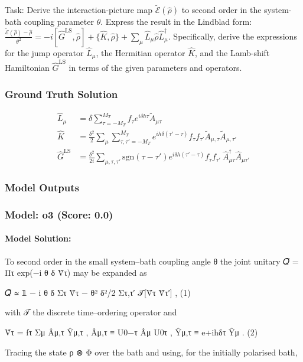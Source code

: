\documentclass[10pt]{article}
\begin{document}
Task:
Derive the interaction-picture map $\tilde{\mathcal{E}}(\hat \rho)$ to second order in the system-bath coupling parameter $\theta$. Express the result in the Lindblad form:
$\frac{\tilde{\mathcal{E}}(\hat\rho)-\hat{\rho}}{\theta^2} = -i[\hat G^{\text{LS}}, \hat\rho]+ \{\hat K,\hat\rho\}+\sum_\mu \hat L_\mu \hat\rho\hat L_\mu^\dagger$.
Specifically, derive the expressions for the jump operator $\hat L_\mu$, the Hermitian operator $\hat K$, and the Lamb-shift Hamiltonian $\hat G^{\text{LS}}$ in terms of the given parameters and operators.

\subsubsection*{Ground Truth Solution}
\[ \boxed{\begin{aligned}
\hat L_\mu &= \delta \sum_{\tau=-M_T}^{M_T} f_\tau e^{i\delta h\tau}\tilde A_{\mu\tau} \\
\hat K &= \frac{\delta^2}{2}\sum_{\mu}\sum_{\tau,\tau'=-M_T}^{M_T}e^{ih\delta(\tau'-\tau)}f_\tau f_{\tau'} \tilde{A}_{\mu,\tau}\tilde{A}_{\mu,\tau'} \\
\hat G^{\text{LS}} &= \frac{\delta^2}{2i}\sum_{\mu,\tau,\tau'}\text{sgn}(\tau-\tau')e^{i\delta h(\tau'-\tau)}f_\tau f_{\tau'}\ \hat A^\dagger_{\mu\tau}\hat A_{\mu\tau'}
\end{aligned}} \]

\subsubsection*{Model Outputs}
\subsubsection*{Model: o3 (Score: 0.0)}
\paragraph*{Model Solution:}
To second order in the small system–bath coupling angle θ the joint unitary  
                           𝑄̃ = Πτ exp(−i θ δ  Ṽτ)  
may be expanded as  

      𝑄̃ ≃ 𝟙 − i θ δ Στ Ṽτ − θ² δ²/2 Στ,τ′ 𝒯[Ṽτ Ṽτ′] ,            (1)

with 𝒯 the discrete time–ordering operator and  

      Ṽτ = fτ Σμ Âμ,τ  Ŷμ,τ ,            Âμ,τ ≡  U0−τ  Âμ  U0τ ,     Ŷμ,τ ≡  e+ihδτ Ŷμ .    (2)

Tracing the state ρ ⊗ Φ over the bath and using, for the initially
polarised bath,  
\end{document}
